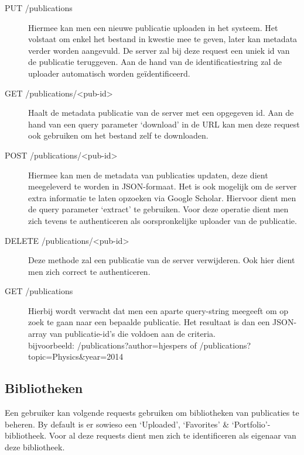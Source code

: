 \documentclass{article}
\begin{document}
\begin{description}

\item[PUT /publications] Hiermee kan men een nieuwe publicatie uploaden in het systeem. Het volstaat om enkel het bestand in kwestie mee te geven, later kan metadata verder worden aangevuld. De server zal bij deze request een uniek id van de publicatie teruggeven. Aan de hand van de identificatiestring zal de uploader automatisch worden ge\"identificeerd.

\item[GET /publications/<pub-id>] Haalt de metadata publicatie van de server met een opgegeven id. Aan de hand van een query parameter `download' in de URL kan men deze request ook gebruiken om het bestand zelf te downloaden.

\item[POST /publications/<pub-id>] Hiermee kan men de metadata van publicaties updaten, deze dient meegeleverd te worden in JSON-formaat. Het is ook mogelijk om de server extra informatie te laten opzoeken via Google Scholar. Hiervoor dient men de query parameter `extract' te gebruiken. Voor deze operatie dient men zich tevens te authenticeren als oorspronkelijke uploader van de publicatie.

\item[DELETE /publications/<pub-id>] Deze methode zal een publicatie van de server verwijderen. Ook hier dient men zich correct te authenticeren.

\item[GET /publications] Hierbij wordt verwacht dat men een aparte query-string meegeeft om op zoek te gaan naar een bepaalde publicatie. Het resultaat is dan een JSON-array van publicatie-id's die voldoen aan de criteria. \\
bijvoorbeeld: /publications?author=hjespers of /publications?topic=Physics\&year=2014

\end{description}

\subsection{Bibliotheken}

Een gebruiker kan volgende requests gebruiken om bibliotheken van publicaties te beheren. By default is er sowieso een `Uploaded', `Favorites' \& `Portfolio'-bibliotheek. Voor al deze requests dient men zich te identificeren als eigenaar van deze bibliotheek.
\end{document}
